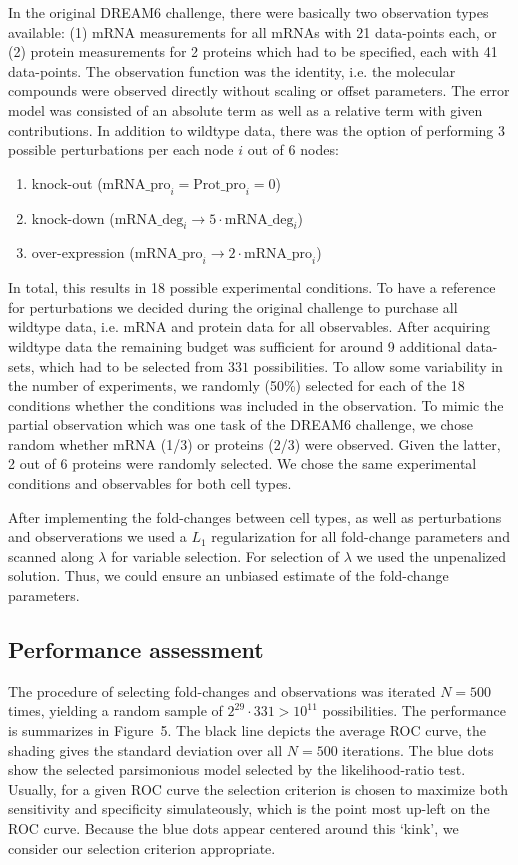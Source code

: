 \documentclass{bioinfo}
\begin{document}
In the original DREAM6 challenge, there were basically two observation types available:
(1) mRNA measurements for all mRNAs with 21 data-points each, or (2) protein measurements for 2 proteins which had to be specified, each with 41 data-points.
The observation function was the identity, i.e. the molecular compounds were observed directly without scaling or offset parameters.
The error model was consisted of an absolute term as well as a relative term with given contributions.
In addition to wildtype data, there was the option of performing 3 possible perturbations per each node $i$ out of 6 nodes:
\begin{enumerate}
\item knock-out ($\text{mRNA\_pro}_i=\text{Prot\_pro}_i=0$)
\item knock-down ($\text{mRNA\_deg}_i\rightarrow 5\cdot \text{mRNA\_deg}_i$)
\item over-expression ($\text{mRNA\_pro}_i \rightarrow 2\cdot \text{mRNA\_pro}_i$)
\end{enumerate}
In total, this results in 18 possible experimental conditions.
To have a reference for perturbations we decided during the original challenge to purchase all wildtype data, i.e. mRNA and protein data for all observables.
After acquiring wildtype data the remaining budget was sufficient for around 9 additional data-sets, which had to be selected from $331$ possibilities.
To allow some variability in the number of experiments, we randomly (50\%) selected for each of the 18 conditions whether the conditions was included in the observation.
To mimic the partial observation which was one task of the DREAM6 challenge, we chose random whether mRNA (1/3) or proteins (2/3) were observed.
Given the latter, 2 out of 6 proteins were randomly selected.
We chose the same experimental conditions and observables for both cell types.

After implementing the fold-changes between cell types, as well as perturbations and observerations we used a $L_1$ regularization for all fold-change parameters and scanned along $\lambda$ for variable selection.
For selection of $\lambda$ we used the unpenalized solution.
Thus, we could ensure an unbiased estimate of the fold-change parameters.

\subsection{Performance assessment}
The procedure of selecting fold-changes and observations was iterated $N=500$ times, yielding a random sample of $2^{29} \cdot 331 > 10^{11}$ possibilities.
The performance is summarizes in Figure~5\vphantom{\ref{fig:05}}.
The black line depicts the average ROC curve, the shading gives the standard deviation over all $N=500$ iterations.
The blue dots show the selected parsimonious model selected by the likelihood-ratio test.
Usually, for a given ROC curve the selection criterion is chosen to maximize both sensitivity and specificity simulateously, which is the point most up-left on the ROC curve.
Because the blue dots appear centered around this `kink', we consider our selection criterion appropriate.
\end{document}
